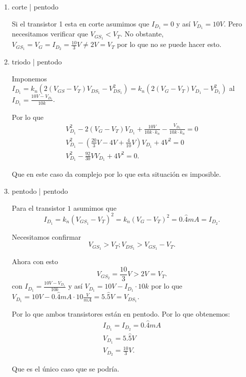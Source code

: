 \documentclass[12pt]{exam}
\begin{document}
    \begin{enumerate}
      \item corte | pentodo

	Si el transistor 1 esta en corte asumimos que $I_{D_{1}} = 0$ y así $V_{D_1} = 10V$. Pero necesitamos verificar que $V_{GS_1} < V_T$. No obstante, $V_{GS_1} = V_G = I_{D_2} = \frac{10}{3}V \neq 2V = V_T$ por lo que no se puede hacer esto.

      \item triodo | pentodo

	Imponemos $I_{D_1} = k_n \left( 2\left( V_{GS} - V_T \right) V_{DS_1} - V_{DS_1}^2 \right) = k_n \left( 2 \left( V_G - V_T \right) V_{D_1} - V_{D_1}^2 \right)  $ al $I_{D_1} = \frac{10V - V_{D_1}}{10 k}$.

	Por lo que
	\begin{align*}
	  V_{D_1}^2 - 2\left( V_G - V_T \right) V_{D_1} + \frac{10V}{10 k \cdot k_n} - \frac{V_{D_1}}{10k\cdot k_n} = 0\\
	  V_{D_1}^2 - \left( \frac{20}{3}V - 4V + \frac{4}{10}V \right) V_{D_1} + 4V^2 = 0\\
	  V_{D_1}^2 - \frac{92}{30}V V_{D_1} + 4V^2 = 0
	.\end{align*}

	Que en este caso da  complejo por lo que esta situación es imposible.

      \item pentodo | pentodo

	Para el transistor $1$ asumimos que  \[
	I_{D_1} = k_n\left( V_{GS_1} - V_T \right)^2 = k_n\left( V_G  - V_T \right)^2 = 0.\hat{4}mA = I_{D_2}
	.\] 

	Necesitamos confirmar \[
	V_{GS_1} > V_T; V_{DS_1}>V_{GS_1} - V_T
	.\] 

	Ahora con esto \[
	V_{GS_2} = \frac{10}{3}V > 2V = V_T
	.\] 
	con $I_{D_1} = \frac{10V - V_{D_1}}{10k}$ y así $V_{D_1}=10V - I_{D_1}\cdot 10k$ por lo que $V_{D_1} = 10V - 0.\hat{4}mA\cdot 10 \frac{V}{mA} = 5.\hat{5}V = V_{DS_1}$.

	Por lo que ambos transistores están en pentodo. Por lo que obtenemos:
	\begin{align*}
	  I_{D_1} = I_{D_2} = 0.\hat{4}mA\\
	  V_{D_1} = 5.\hat{5}V\\
	  V_{D_2} = \frac{10}{3}V
	.\end{align*}

	Que es el único caso que se podría.
    \end{enumerate}
\end{document}
